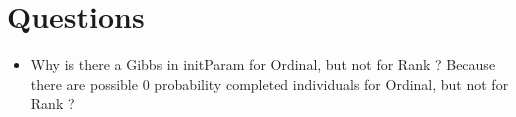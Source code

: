 \documentclass{article}
\begin{document}
\section{Questions}

\begin{itemize}

\item Why is there a Gibbs in initParam for Ordinal, but not for Rank ? Because there are possible 0 probability completed individuals for Ordinal, but not for Rank ?
	
\end{itemize}
\end{document}

